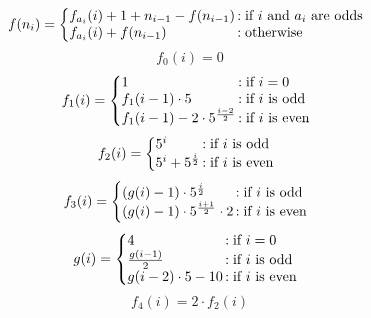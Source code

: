 \documentclass{article}
\begin{document}
\[ f(n_{i}) = \left\{
     \begin{array}{@{}l@{\thinspace}l}
       f_{a_{i}}(i)+1+n_{i-1}-f(n_{i-1})  &:\text{if } i \text{ and } a_{i} \text{ are odds}\\
       f_{a_{i}}(i)+f(n_{i-1}) &: \text{otherwise}\\
     \end{array}
   \right. \]
\[ f_{0}(i)=0 \]
\[ f_{1}(i)=\left\{
     \begin{array}{@{}l@{\thinspace}l}
       1 &:\text{if } i=0\\
       f_{1}(i-1)\cdot 5 &: \text{if } i \text{ is odd}\\
       f_{1}(i-1)-2\cdot 5^{\frac{i-2}{2}} &: \text{if } i \text{ is even}\\
     \end{array}
   \right. \]
\[ f_{2}(i)=\left\{
    \begin{array}{@{}l@{\thinspace}l}
      5^{i} &: \text{if } i \text{ is odd}\\
      5^{i}+5^{\frac{i}{2}} &: \text{if } i \text{ is even}\\
    \end{array}
  \right. \]
\[ f_{3}(i)=\left\{
    \begin{array}{@{}l@{\thinspace}l}
      (g(i)-1)\cdot 5^{\frac{i}{2}} &: \text{if } i \text{ is odd}\\
      (g(i)-1)\cdot 5^{\frac{i+1}{2}}\cdot 2 &: \text{if } i \text{ is even}\\
    \end{array}
  \right. \]
  \[ g(i)=\left\{
    \begin{array}{@{}l@{\thinspace}l}
      4 &: \text{if } i=0\\
      \frac{g(i-1)}{2} &: \text{if } i \text{ is odd}\\
      g(i-2)\cdot 5 - 10 &: \text{if } i \text{ is even}\\
    \end{array}
  \right. \]
\[ f_{4}(i) = 2\cdot f_{2}(i) \]
\end{document}
